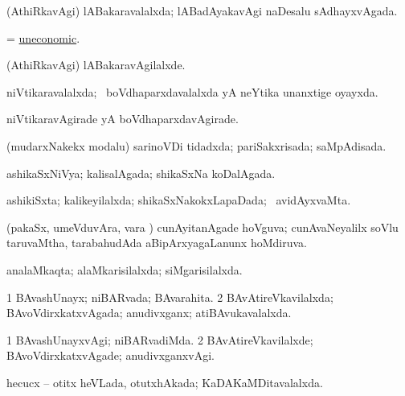 \bentry
{} 
\gl{\gu}
\expl{}
\bmng
(AthiRkavAgi) lABakaravalalxda; lABadAyakavAgi naDesalu sAdhayxvAgada. 
\emng
\eentry

\bentry
{} 
\gl{\gu}
\expl{}
\bmng
 = \hyperlink{uneconomic}{uneconomic}. 
\emng
\eentry

\bentry
{} 
\gl{\kirxvi}
\expl{}
\bmng
 (AthiRkavAgi) lABakaravAgilalxde. 
\emng
\eentry

\bentry
{} 
\gl{\gu}
\expl{}
\bmng
 niVtikaravalalxda; \kanmu\ boVdhaparxdavalalxda yA neYtika unanxtige oyayxda. 
\emng
\eentry

\bentry
{} 
\gl{\kirxvi}
\expl{}
\bmng
 niVtikaravAgirade yA boVdhaparxdavAgirade. 
\emng
\eentry

\bentry
{} 
\gl{\gu}
\bmng
 (mudarxNakekx modalu) sarinoVDi tidadxda; pariSakxrisada; saMpAdisada. 
\emng
\eentry

\bentry
{} 
\gl{\gu}
\expl{}
\bmng
ashikaSxNiVya; kalisalAgada; shikaSxNa koDalAgada. 
\emng
\eentry

\bentry
{} 
\gl{\gu}
\expl{}
\bmng
 ashikiSxta; kalikeyilalxda; shikaSxNakokxLapaDada; \kanmu\ avidAyxvaMta. 
\emng
\eentry

\bentry
{} 
\gl{\gu}
\expl{}
\bmng
 (pakaSx, umeVduvAra, \mo vara \vi) cunAyitanAgade hoVguva; cunAvaNeyalilx soVlu taruvaMtha, tarabahudAda aBipArxyagaLanunx hoMdiruva. 
\emng
\eentry

\bentry
{} 
\gl{\gu}
\expl{}
\bmng
 analaMkaqta; alaMkarisilalxda; siMgarisilalxda. 
\emng
\eentry

\bentry
{} 
\gl{\gu}
\expl{}
\bmng
\bnum
\num{1} BAvashUnayx; niBARvada; BAvarahita. 
\num{2} BAvAtireVkavilalxda; BAvoVdirxkatxvAgada; anudivxganx; atiBAvukavalalxda. 
\enum
\emng
\eentry

\bentry
{} 
\gl{\kirxvi}
\expl{}
\bmng
\bnum
\num{1} BAvashUnayxvAgi; niBARvadiMda. 
\num{2} BAvAtireVkavilalxde; BAvoVdirxkatxvAgade; anudivxganxvAgi. 
\enum
\emng
\eentry

\bentry
{} 
\gl{\gu}
\expl{}
\bmng
 hecucx -- otitx heVLada, otutxhAkada; KaDAKaMDitavalalxda. 
\emng
\eentry

